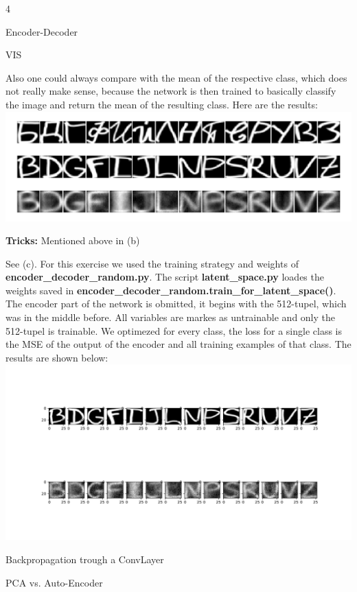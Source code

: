 \documentclass{article}
\begin{document}
\begin{ukon-infie}[28.1.18]{4}
\begin{exercise}[p=60]{Encoder-Decoder}
{		VIS
		
		
		Also one could always compare with the mean of the respective class, which does not really make sense, because the network is then trained to basically classify the image and return the mean of the resulting class. Here are the results:\\
		\includegraphics[scale=0.5]{decoder_encoder_mean.png}
		
		\textbf{Tricks:} Mentioned above in (b)
		
		}
		\question{}
		{
		See (c).
		}
		\question{}
		{
		For this exercise we used the training strategy and weights of \textbf{encoder\_decoder\_random.py}. The script \textbf{latent\_space.py} loades the weights saved in \textbf{encoder\_decoder\_random.train\_for\_latent\_space()}. The encoder part of the network is obmitted, it begins with the 512-tupel, which was in the middle before. All variables are markes as untrainable and only the 512-tupel is trainable. We optimezed for every class, the loss for a single class is the MSE of the output of the encoder and all training examples of that class. The results are shown below:\\
		
		\includegraphics[scale=0.5]{latent_space.png}
		}
		
		\end{exercise}
		
		\begin{exercise}[p=10]{Backpropagation trough a ConvLayer}
		\question{}
		{
		}
		\question{}
		{
			
		}
		
		\end{exercise}
		\begin{exercise}[p=20]{PCA vs. Auto-Encoder}
		\question{}
		{
		}
		\question{}
		{
			
		}
		\question{}
		{
			
		}
		
		\end{exercise}

\end{ukon-infie}
\end{document}

